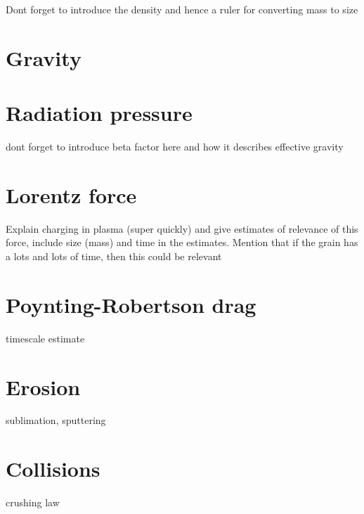 Dont forget to introduce the density and hence a ruler for converting mass to size

\section{Gravity}

\section{Radiation pressure}

dont forget to introduce beta factor here and how it describes effective gravity

\section{Lorentz force}

Explain charging in plasma (super quickly) and give estimates of relevance of this force, include size (mass) and time in the estimates. Mention that if the grain has a lots and lots of time, then this could be relevant

\section{Poynting-Robertson drag}

timescale estimate 

\section{Erosion}

sublimation, sputtering

\section{Collisions}

crushing law